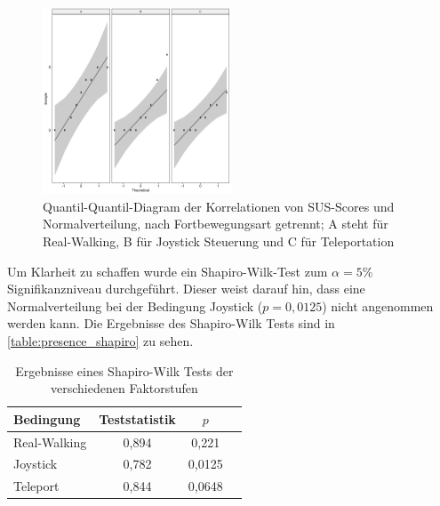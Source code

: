                     \begin{figure}[!h]
                        \centering
                        \includegraphics[width=0.5\textwidth]{plots/presence_normality.png}
                        \caption{Quantil-Quantil-Diagram der Korrelationen von SUS-Scores und Normalverteilung, nach Fortbewegungsart getrennt; A steht für Real-Walking, B für Joystick Steuerung und C für Teleportation }\label{figure:presence_normality}
                    \end{figure}

                    Um Klarheit zu schaffen wurde ein Shapiro-Wilk-Test zum $\alpha = 5\%$ Signifikanzniveau durchgeführt. Dieser weist darauf hin, dass eine Normalverteilung bei der Bedingung Joystick ($p = 0,0125$) nicht angenommen werden kann. Die Ergebnisse des Shapiro-Wilk Tests sind in \autoref{table:presence_shapiro} zu sehen.

                    \begin{table}[!h]
                        \renewcommand\arraystretch{1.2}
                        \centering
                        \begin{tabular}{lccc} \toprule
                            Bedingung    & Teststatistik    & $p$   \\ \midrule
                            Real-Walking & 0,894            & 0,221  \\
                            Joystick     & 0,782            & 0,0125  \\
                            Teleport     & 0,844            & 0,0648  \\ \bottomrule
                        \end{tabular}
                        \caption{Ergebnisse eines Shapiro-Wilk Tests der verschiedenen Faktorstufen}\label{table:presence_shapiro}
                    \end{table}

